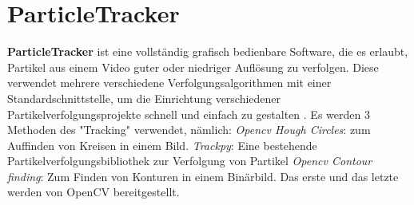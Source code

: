 
\section{ParticleTracker \label{kap1_ParticleTracker}}
\textbf{ParticleTracker} ist eine vollständig grafisch bedienbare Software, die es erlaubt, Partikel aus einem Video guter oder niedriger Auflösung zu verfolgen. Diese verwendet mehrere verschiedene Verfolgungsalgorithmen mit einer Standardschnittstelle, um die Einrichtung verschiedener Partikelverfolgungsprojekte schnell und einfach zu gestalten \cite{Smith2021}.
Es werden 3 Methoden des "Tracking" verwendet, nämlich:
\textit{Opencv Hough Circles}: zum Auffinden von Kreisen in einem Bild.
\textit{Trackpy}: Eine bestehende Partikelverfolgungsbibliothek zur Verfolgung von Partikel 
\textit{Opencv Contour finding}: Zum Finden von Konturen in einem Binärbild.
Das erste und das letzte werden von OpenCV \cite{opencv_library} bereitgestellt.

